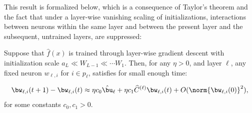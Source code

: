 This result is formalized below, which is a consequence of Taylor's theorem and the fact that under a layer-wise vanishing scaling of initializations, interactions between neurons within the same layer and between the present layer and the subsequent, untrained layers, are suppressed: 
\begin{proposition}[Informal]\label{2605:thm:layerwise-GD}
Suppose that  $\hat f(x)$ is trained through layer-wise gradient descent with initialization scale  $a_{L} \ll W_{L-1} \ll \cdots W_1$. Then, for any $\eta>0$, and layer $\ell$, any fixed neuron $w_{\ell,i}$ for $i \in p_{\ell}$, satisfies for small enough time:

\begin{equation}\label{2605:eq:thm1approxmain}
\bw_{\ell,i}(t+1) - \bw_{\ell,i}(t)
\approx \eta c_0 \hat{\bu}_\ell
+ \eta c_1\widehat{C}^{(\ell)} \bw_{\ell,i}(t)+O(\norm{\bw_{\ell,i}(0)}^2),
\end{equation}
for some constants $c_0,c_1>0$.
\end{proposition}

